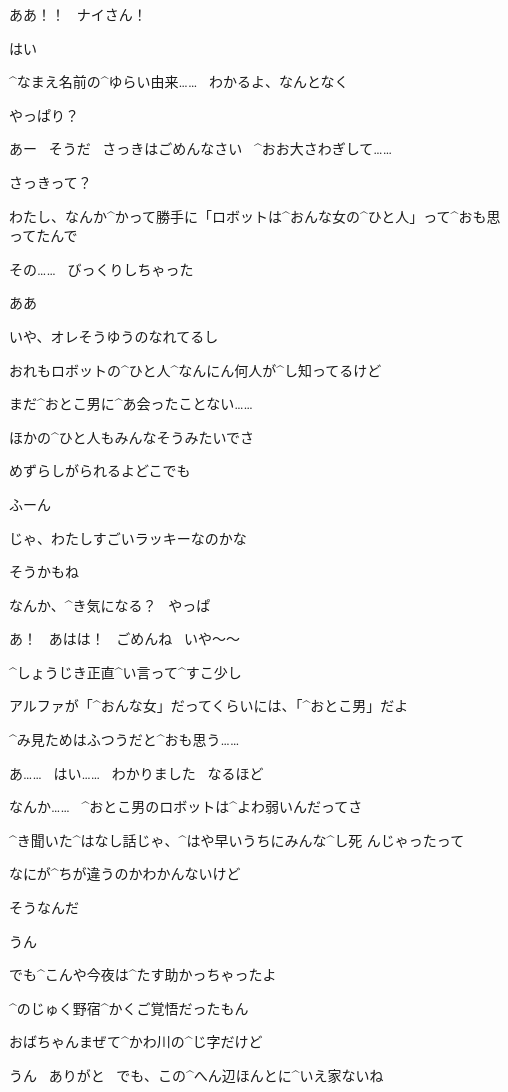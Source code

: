 \A ああ！！
\ ナイさん！

\NA はい

\A ^{なまえ}{名前}の^{ゆらい}{由来}……
\ わかるよ、なんとなく

\NA やっぱり？

\page
\A あー
\ そうだ
\ さっきはごめんなさい
\ ^{おお}{大}さわぎして……

\NA さっきって？

\A わたし、なんか^{かって}{勝手}に「ロボットは^{おんな}{女}の^{ひと}{人}」って^{おも}{思}ってたんで

\A その……
\ びっくりしちゃった

\NA ああ

\NA いや、オレそうゆうのなれてるし

\page
\NA おれもロボットの^{ひと}{人}^{なんにん}{何人}が^{し}{知}ってるけど

\NA まだ^{おとこ}{男}に^{あ}{会}ったことない……

\NA ほかの^{ひと}{人}もみんなそうみたいでさ

\NA めずらしがられるよどこでも

\A ふーん

\A じゃ、わたしすごいラッキーなのかな

\NA そうかもね

\page
\NA なんか、^{き}{気}になる？
\ やっぱ

\A あ！
\ あはは！
\ ごめんね
\ いや〜〜

\A ^{しょうじき}{正直}^{い}{言}って^{すこ}{少}し

\NA アルファが「^{おんな}{女}」だってくらいには、「^{おとこ}{男}」だよ

\NA ^{み}{見}ためはふつうだと^{おも}{思}う……

\A あ……
\ はい……
\ わかりました
\ なるほど

\page
\NA なんか……
\ ^{おとこ}{男}のロボットは^{よわ}{弱}いんだってさ

\NA ^{き}{聞}いた^{はなし}{話}じゃ、^{はや}{早}いうちにみんな^{し}{死}
んじゃったって

\NA なにが^{ちが}{違}うのかわかんないけど

\A そうなんだ

\NA うん

\page
\A でも^{こんや}{今夜}は^{たす}{助}かっちゃったよ

\A ^{のじゅく}{野宿}^{かくご}{覚悟}だったもん

\NA おばちゃんまぜて^{かわ}{川}の^{じ}{字}だけど

\A うん
\ ありがと
\ でも、この^{へん}{辺}ほんとに^{いえ}{家}ないね

